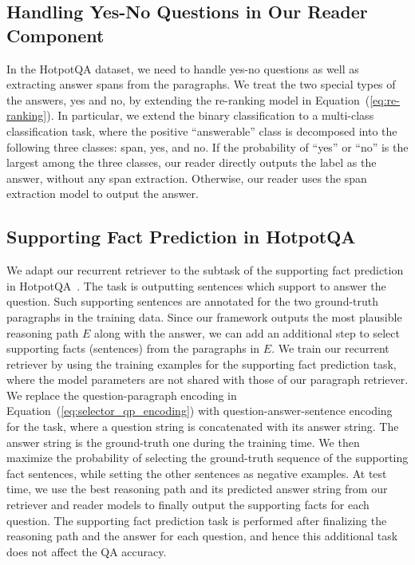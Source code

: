 \subsection{Handling Yes-No Questions in Our Reader Component}
\label{subsec:appendix_modeling}
In the HotpotQA dataset, we need to handle yes-no questions as well as extracting answer spans from the paragraphs.
We treat the two special types of the answers, yes and no, by extending the re-ranking model in Equation~(\ref{eq:re-ranking}).
In particular, we extend the binary classification to a multi-class classification task, where the positive ``answerable'' class is decomposed into the following three classes: span, yes, and no.
If the probability of ``yes'' or ``no'' is the largest among the three classes, our reader directly outputs the label as the answer, without any span extraction.
Otherwise, our reader uses the span extraction model to output the answer.

\subsection{Supporting Fact Prediction in HotpotQA}
\label{subsec:appendix_sp}

We adapt our recurrent retriever to the subtask of the supporting fact prediction in HotpotQA~\citep{yang-etal-2018-hotpotqa}.
The task is outputting sentences which support to answer the question.
Such supporting sentences are annotated for the two ground-truth paragraphs in the training data.
Since our framework outputs the most plausible reasoning path $E$ along with the answer, we can add an additional step to select supporting facts (sentences) from the paragraphs in $E$.
We train our recurrent retriever by using the training examples for the supporting fact prediction task, where the model parameters are not shared with those of our paragraph retriever.
We replace the question-paragraph encoding in Equation~(\ref{eq:selector_qp_encoding}) with question-answer-sentence encoding for the task, where a question string is concatenated with its answer string.
The answer string is the ground-truth one during the training time.
We then maximize the probability of selecting the ground-truth sequence of the supporting fact sentences, while setting the other sentences as negative examples.
At test time, we use the best reasoning path and its predicted answer string from our retriever and reader models to finally output the supporting facts for each question.
The supporting fact prediction task is performed after finalizing the reasoning path and the answer for each question, and hence this additional task does not affect the QA accuracy.

